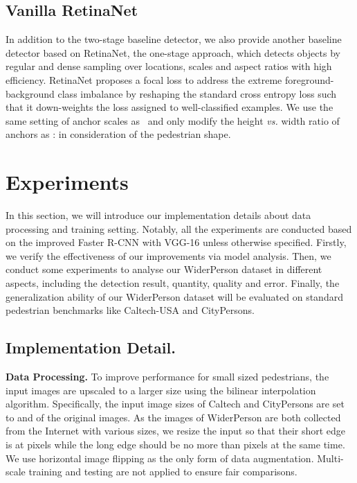 \documentclass[journal]{IEEEtran}
\begin{document}
\subsection{Vanilla RetinaNet}
In addition to the two-stage baseline detector, we also provide another baseline detector based on RetinaNet, the one-stage approach, which detects objects by regular and dense sampling over locations, scales and aspect ratios with high efficiency. RetinaNet proposes a focal loss to address the extreme foreground-background class imbalance by reshaping the standard cross entropy loss such that it down-weights the loss assigned to well-classified examples. We use the same setting of anchor scales as~\cite{DBLP:conf/iccv/LinPRK17} and only modify the height \emph{vs.} width ratio of anchors as : in consideration of the pedestrian shape.

\section{Experiments} \label{5}
In this section, we will introduce our implementation details about data processing and training setting. Notably, all the experiments are conducted based on the improved Faster R-CNN with VGG-16 unless otherwise specified. Firstly, we verify the effectiveness of our improvements via model analysis. Then, we conduct some experiments to analyse our WiderPerson dataset in different aspects, including the detection result, quantity, quality and error. Finally, the generalization ability of our WiderPerson dataset will be evaluated on standard pedestrian benchmarks like Caltech-USA and CityPersons.


\subsection{Implementation Detail.}
{\flushleft \textbf{Data Processing. }}
To improve performance for small sized pedestrians, the input images are upscaled to a larger size using the bilinear interpolation algorithm. Specifically, the input image sizes of Caltech and CityPersons are set to  and  of the original images. As the images of WiderPerson are both collected from the Internet with various sizes, we resize the input so that their short edge is at  pixels while the long edge should be no more than  pixels at the same time. We use horizontal image flipping as the only form of data augmentation. Multi-scale training and testing are not applied to ensure fair comparisons.
\end{document}
